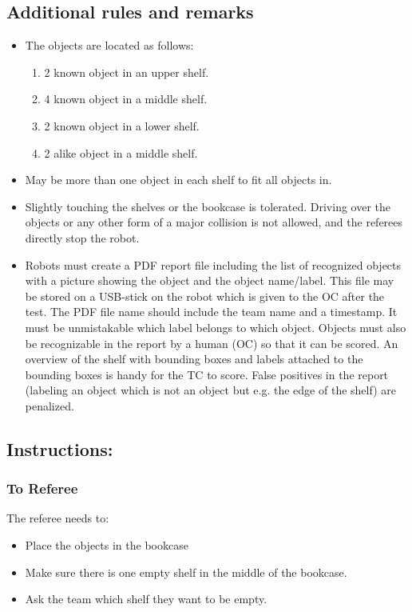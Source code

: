 \subsection*{Additional rules and remarks}
\begin{itemize}[nosep]
	\item The objects are located as follows:
	\begin{enumerate}[nosep]
		\item 2 known object in an upper shelf.
		\item 4 known object in a middle shelf. 
		\item 2 known object in a lower shelf. 
		\item 2 alike object in a middle shelf.
	\end{enumerate}
	\item May be more than one object in each shelf to fit all objects in.
	\item Slightly touching the shelves or the bookcase is tolerated. Driving over the objects or any other form of a major collision is not allowed, and the referees directly stop the robot.
	\item Robots must create a PDF report file including the list of recognized objects with a picture showing the object and the object name/label. This file may be stored on a USB-stick on the robot which is given to the OC after the test. The PDF file name should include the team name and a timestamp. It must be unmistakable which label belongs to which object. Objects must also be recognizable in the report by a human (OC) so that it can be scored. An overview of the shelf with bounding boxes and labels attached to the bounding boxes is handy for the TC to score. False positives in the report (labeling an object which is not an object but e.g. the edge of the shelf) are penalized.
\end{itemize}

\subsection*{Instructions:}
\subsubsection*{To Referee}

The referee needs to:
\begin{itemize}
	\item Place the objects in the bookcase
	\item Make sure there is one empty shelf in the middle of the bookcase. 
	\item Ask the team which shelf they want to be empty.
\end{itemize}

